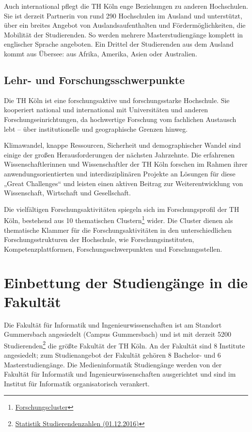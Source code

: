 Auch international pflegt die TH Köln enge Beziehungen zu anderen
Hochschulen. Sie ist derzeit Partnerin von rund 290 Hochschulen im
Ausland und unterstützt, über ein breites Angebot von
Auslandsaufenthalten und Fördermöglichkeiten, die Mobilität der
Studierenden. So werden mehrere Masterstudiengänge komplett in
englischer Sprache angeboten. Ein Drittel der Studierenden aus dem
Ausland kommt aus Übersee: aus Afrika, Amerika, Asien oder Australien.

\subsection{Lehr- und
Forschungsschwerpunkte}\label{lehr--und-forschungsschwerpunkte}

Die TH Köln ist eine forschungsaktive und forschungsstarke Hochschule.
Sie kooperiert national und international mit Universitäten und anderen
Forschungseinrichtungen, da hochwertige Forschung vom fachlichen
Austausch lebt -- über institutionelle und geographische Grenzen hinweg.

Klimawandel, knappe Ressourcen, Sicherheit und demographischer Wandel
sind einige der großen Herausforderungen der nächsten Jahrzehnte. Die
erfahrenen Wissenschaftlerinnen und Wissenschaftler der TH Köln forschen
im Rahmen ihrer anwendungsorientierten und interdisziplinären Projekte
an Lösungen für diese „Great Challenges`` und leisten einen aktiven
Beitrag zur Weiterentwicklung von Wissenschaft, Wirtschaft und
Gesellschaft.

Die vielfältigen Forschungsaktivitäten spiegeln sich im Forschungsprofil
der TH Köln, bestehend aus 10 thematischen Clustern\footnote{\href{https://www.th-koeln.de/forschung/cluster_2734.php}{Forschungscluster}}
wider. Die Cluster dienen als thematische Klammer für die
Forschungsaktivitäten in den unterschiedlichen Forschungsstrukturen der
Hochschule, wie Forschungsinstituten, Kompetenzplattformen,
Forschungsschwerpunkten und Forschungsstellen.

\section{Einbettung der Studiengänge in die
Fakultät}\label{einbettung-der-studienguxe4nge-in-die-fakultuxe4t}

Die Fakultät für Informatik und Ingenieurwissenschaften ist am Standort
Gummersbach angesiedelt (Campus Gummersbach) und ist mit derzeit 5200
Studierenden\footnote{\href{https://th-koeln.github.io/mi-2017/anhaenge/stat-Studentenzahlen_WS-2016_(01.12.2016).pdf}{Statistik
  Studierendenzahlen (01.12.2016)}} die größte Fakultät der TH Köln. An
der Fakultät sind 8 Institute angesiedelt; zum Studienangebot der
Fakultät gehören 8 Bachelor- und 6 Masterstudiengänge. Die
Medieninformatik Studiengänge werden von der Fakultät für Informatik und
Ingenieurwissenschaften ausgerichtet und sind im Institut für Informatik
organisatorisch verankert.

